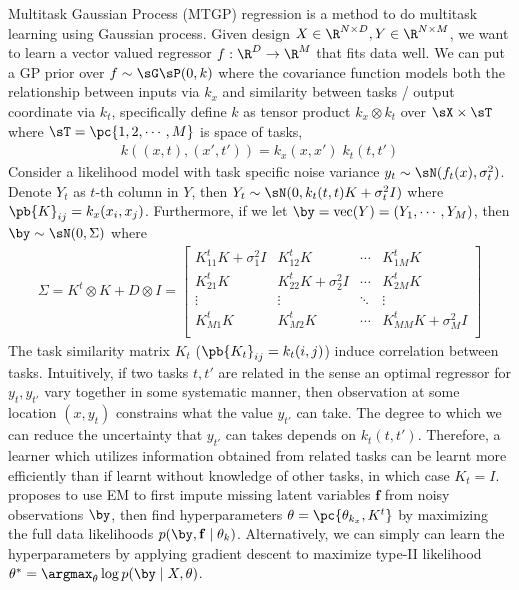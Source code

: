 \documentclass[11pt]{article}
\begin{document}
Multitask Gaussian Process (MTGP) regression \cite{bonillaMultitaskGaussianProcess2008} is a method to do multitask learning using Gaussian process. Given design $X\in\R^{N\times D}, Y\in\R^{N\times M}$, we want to learn a vector valued regressor $f:\R^D\to\R^M$ that fits data well. We can put a GP prior over $f \sim \sG\sP(0,k)$ where the covariance function models both the relationship between inputs via $k_x$ and similarity between tasks / output coordinate via $k_t$, specifically define $k$ as tensor product $k_x\otimes k_t$ over $\sX\times\sT$ where $\sT = \pc{1,2,\cdots,M}$ is space of tasks,
\begin{align}
    k((x,t),(x',t')) = k_x(x,x')\; k_t(t,t')
\end{align}
Consider a likelihood model with task specific noise variance $y_t \sim \sN( f_t(x), \sigma_t^2 )$. Denote $Y_t$ as $t$-th column in $Y$, then $Y_t \sim \sN( 0,  k_t(t,t) K + \sigma_t^2 I )$ where $\pb{K}_{ij} = k_x(x_i,x_j)$. Furthermore, if we let $\by = \text{vec}(Y) = (Y_1,\cdots,Y_M)$, then $\by \sim \sN(0,\Sigma)$ where
\begin{align}
    \Sigma = 
    K^t \otimes K + D \otimes I
    = 
    \begin{bmatrix}
        K^t_{11} K + \sigma_1^2 I & K^t_{12} K & \cdots & K^t_{1M} K \\ 
        K^t_{21} K & K^t_{22}K + \sigma_2^2 I & \cdots & K^t_{2M} K \\ 
        \vdots & \vdots & \ddots & \vdots \\
        K^t_{M1} K & K^t_{M2}K  & \cdots & K^t_{MM} K + \sigma_M^2 I \\
    \end{bmatrix}
\end{align}
The task similarity matrix $K_t$ ($\pb{K_t}_{ij} = k_t(i,j)$) induce correlation between tasks. Intuitively, if two tasks $t,t'$ are related in the sense an optimal regressor for $y_t,y_{t'}$ vary together in some systematic manner, then observation at some location $(x,y_t)$ constrains what the value $y_{t'}$ can take. The degree to which we can reduce the uncertainty that $y_{t'}$ can takes depends on $k_t(t,t')$. Therefore, a learner which utilizes information obtained from related tasks can be learnt more efficiently than if learnt without knowledge of other tasks, in which case $K_t = I$. \cite{bonillaMultitaskGaussianProcess2008} proposes to use EM to first impute missing latent variables $\mathbf{f}$ from noisy observations $\by$, then find hyperparameters $\theta = \pc{ \theta_{k_x}, K^t }$ by maximizing the full data likelihoods $p(\by,\mathbf{f} \mid \theta_{k})$. Alternatively, we can simply can learn the hyperparameters by applying gradient descent to maximize type-II likelihood $\theta^* = \argmax_{\theta} \log p(\by\mid X, \theta)$.
\end{document}
